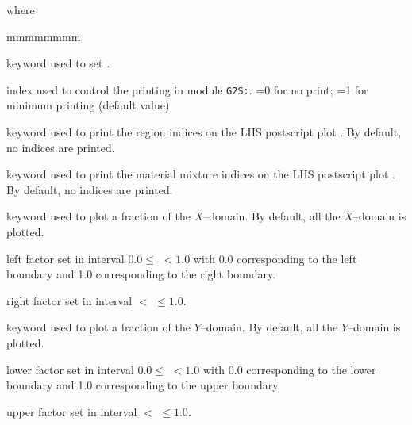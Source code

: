 \noindent where
\begin{ListeDeDescription}{mmmmmmmm}

\item[\moc{EDIT}] keyword used to set .

\item[\dusa{iprint}] index used to control the printing in module {\tt G2S:}. =0 for no print; =1 for minimum printing (default value).

\item[\moc{DRAWNOD}] keyword used to print the region indices on the LHS postscript plot . By default, no indices are printed.

\item[\moc{DRAWMIX}] keyword used to print the material mixture indices on the LHS postscript plot . By default, no indices are printed.

\item[\moc{ZOOMX}] keyword used to plot a fraction of the $X$--domain. By default, all the $X$--domain is plotted.

\item[\dusa{facx1}] left factor set in interval $0.0 \le$  $< 1.0$ with 0.0 corresponding to the left boundary and 1.0 corresponding to the right boundary.

\item[\dusa{facx2}] right factor set in interval  $<$  $\le 1.0$.

\item[\moc{ZOOMY}] keyword used to plot a fraction of the $Y$--domain. By default, all the $Y$--domain is plotted.

\item[\dusa{facy1}] lower factor set in interval  $0.0 \le$  $< 1.0$ with 0.0 corresponding to the lower boundary and 1.0 corresponding to the upper boundary.

\item[\dusa{facy2}] upper factor set in interval  $<$  $\le 1.0$.

\end{ListeDeDescription}


\clearpage
